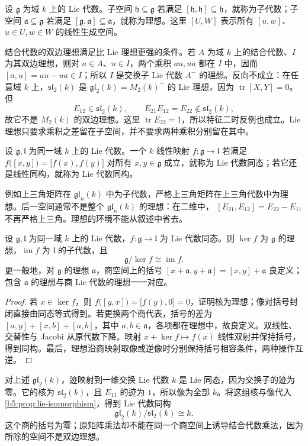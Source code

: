 \begin{definition}\label{b5:def:lie-subalgebra-ideal}
	设 \(\mathfrak g\) 为域 \(k\) 上的 Lie 代数。子空间 \(\mathfrak h\subseteq\mathfrak g\) 若满足 \([\mathfrak h,\mathfrak h]\subseteq\mathfrak h\)，就称为子代数；子空间 \(\mathfrak a\subseteq\mathfrak g\) 若满足 \([\mathfrak g,\mathfrak a]\subseteq\mathfrak a\)，就称为理想。这里 \([U,W]\) 表示所有 \([u,w]\)、\(u\in U,w\in W\) 的线性生成空间。
\end{definition}
结合代数的双边理想满足比 Lie 理想更强的条件。若 \(A\) 为域 \(k\) 上的结合代数、\(I\) 为其双边理想，则对 \(a\in A\)、\(u\in I\)，两个乘积 \(au,ua\) 都在 \(I\) 中，因而 \([a,u]=au-ua\in I\)；所以 \(I\) 是交换子 Lie 代数 \(A^{-}\) 的理想。反向不成立：在任意域 \(k\) 上，\(\mathfrak{sl}_2(k)\) 是 \(\mathfrak{gl}_2(k)=M_2(k)^{-}\) 的 Lie 理想，因为 \(\operatorname{tr}[X,Y]=0\)。但
\[
	E_{12}\in\mathfrak{sl}_2(k),\qquad E_{21}E_{12}=E_{22}\notin\mathfrak{sl}_2(k),
\]
故它不是 \(M_2(k)\) 的双边理想。这里 \(\operatorname{tr}E_{22}=1\)，所以特征二时反例也成立。Lie 理想只要求乘积之差留在子空间，并不要求两种乘积分别留在其中。
\begin{definition}\label{b5:def:lie-homomorphism}
	设 \(\mathfrak g,\mathfrak l\) 为同一域 \(k\) 上的 Lie 代数。一个 \(k\) 线性映射 \(f:\mathfrak g\to\mathfrak l\) 若满足 \(f\bigl([x,y]\bigr)=\bigl[f(x),f(y)\bigr]\) 对所有 \(x,y\in\mathfrak g\) 成立，就称为 Lie 代数同态；若它还是线性同构，就称为 Lie 代数同构。
\end{definition}
例如上三角矩阵在 \(\mathfrak{gl}_n(k)\) 中为子代数，严格上三角矩阵在上三角代数中为理想。后一空间通常不是整个 \(\mathfrak{gl}_n(k)\) 的理想：在二维中， \([E_{21},E_{12}]=E_{22}-E_{11}\) 不再严格上三角。理想的环境不能从叙述中省去。
\begin{proposition}\label{b5:prop:lie-isomorphism}
	设 \(\mathfrak g,\mathfrak l\) 为同一域 \(k\) 上的 Lie 代数，\(f:\mathfrak g\to\mathfrak l\) 为 Lie 代数同态。则 \(\ker f\) 为 \(\mathfrak g\) 的理想，\(\operatorname{im}f\) 为 \(\mathfrak l\) 的子代数，且
	\[
		\mathfrak g/\ker f\cong\operatorname{im}f.
	\]
	更一般地，对 \(\mathfrak g\) 的理想 \(\mathfrak a\)，商空间上的括号 \([x+\mathfrak a,y+\mathfrak a]=[x,y]+\mathfrak a\) 良定义；包含 \(\mathfrak a\) 的理想与商 Lie 代数的理想一一对应。
\end{proposition}
\begin{proof}
	若 \(x\in\ker f\)，则 \(f\bigl([y,x]\bigr)=\bigl[f(y),0\bigr]=0\)，证明核为理想；像对括号封闭直接由同态等式得到。若更换两个商代表，括号的差为 \([a,y]+[x,b]+[a,b]\)，其中 \(a,b\in\mathfrak a\)，各项都在理想中，故良定义。双线性、交替性与 Jacobi 从原代数下降。映射 \(x+\ker f\mapsto f(x)\) 线性双射并保持括号，得到同构。最后，理想沿商映射取像或逆像时分别保持括号相容条件，两种操作互逆。
\end{proof}
对上述 \(\mathfrak{gl}_2(k)\)，迹映射到一维交换 Lie 代数 \(k\) 是 Lie 同态，因为交换子的迹为零。它的核为 \(\mathfrak{sl}_2(k)\)，且 \(E_{11}\) 的迹为 \(1\)，所以像为全部 \(k\)。将这组核与像代入\cref{b5:prop:lie-isomorphism}，得到 Lie 代数同构
\[
	\mathfrak{gl}_2(k)/\mathfrak{sl}_2(k)\cong k.
\]
这个商的括号为零；原矩阵乘法却不能在同一个商空间上诱导结合代数乘法，因为所除的空间不是双边理想。

